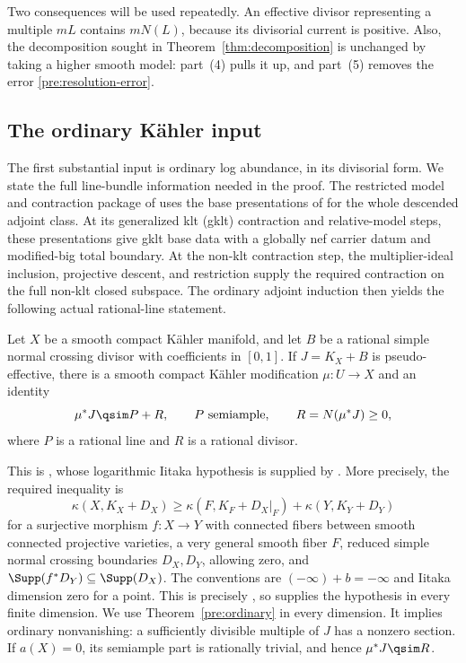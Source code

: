Two consequences will be used repeatedly. An effective divisor
representing a multiple \(mL\) contains \(mN(L)\), because its divisorial
current is positive. Also, the decomposition sought in
Theorem~\ref{thm:decomposition} is unchanged by taking a higher smooth
model: part~(4) pulls it up, and part~(5) removes the error
\eqref{pre:resolution-error}.

\subsection{The ordinary K\"ahler input}

The first substantial input is ordinary log abundance, in its
divisorial form. We state the full line-bundle information needed
in the proof. The restricted model and contraction package of
\cite[Theorem~3.55]{K} uses the base presentations of
\cite[Proposition~3.30]{K} for the whole descended adjoint class.
At its generalized klt (gklt) contraction and relative-model steps,
these presentations give gklt base data with a globally nef carrier
datum and modified-big
total boundary. At the non-klt contraction step, the multiplier-ideal
inclusion, projective descent, and restriction supply the required
contraction on the full non-klt closed subspace. The ordinary adjoint
induction then yields the following actual rational-line statement.

\begin{theorem}\label{pre:ordinary}
Let \(X\) be a smooth compact K\"ahler manifold, and let \(B\) be a
rational simple normal crossing divisor with coefficients in \([0,1]\).
If \(J=K_X+B\) is pseudo-effective, there is a smooth compact K\"ahler
modification \(\mu:U\to X\) and an identity
\[
 \mu^*J\qsim P+R,\qquad P\text{ semiample},\qquad
 R=N(\mu^*J)\geq0,
\]
where \(P\) is a rational line and \(R\) is a rational divisor.
\end{theorem}

This is \cite[Theorem~2.13]{K}, whose logarithmic Iitaka hypothesis is
supplied by \cite[Corollary~6.2]{LI}. More precisely, the required inequality
is
\[
 \kappa(X,K_X+D_X)\geq
 \kappa(F,K_F+D_X|_F)+\kappa(Y,K_Y+D_Y)
\]
for a surjective morphism \(f:X\to Y\) with connected fibers between
smooth connected projective varieties, a very general smooth fiber
\(F\), reduced simple normal crossing boundaries \(D_X,D_Y\),
allowing zero, and \(\Supp(f^*D_Y)\subseteq\Supp(D_X)\).
The conventions are \((-\infty)+b=-\infty\) and Iitaka dimension
zero for a point. This is precisely \cite[Assumption~1.1]{K}, so
\cite[Corollary~6.2]{LI} supplies the hypothesis in every finite
dimension. We use Theorem~\ref{pre:ordinary} in every dimension. It implies ordinary nonvanishing: a sufficiently divisible
multiple of \(J\) has a nonzero section. If \(a(X)=0\), its semiample
part is rationally trivial, and hence \(\mu^*J\qsim R\).

